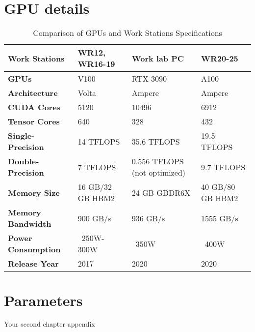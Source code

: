 \documentclass[report.tex]{subfiles}
\begin{document}
    \chapter{GPU details}
    \label{appendix:gpu_details}

    \begin{table}[h]
        \centering
        \caption{Comparison of GPUs and Work Stations Specifications}
        \begin{tabular}{|l|l|l|l|}
        \hline
        \textbf{Work Stations} & \textbf{WR12, WR16-19} & \textbf{Work lab PC} & \textbf{WR20-25} \\ \hline
        \textbf{GPUs} & V100 & RTX 3090 & A100 \\ \hline
        \textbf{Architecture} & Volta & Ampere & Ampere \\ \hline
        \textbf{CUDA Cores} & 5120 & 10496 & 6912 \\ \hline
        \textbf{Tensor Cores} & 640 & 328 & 432 \\ \hline
        \textbf{Single-Precision} & 14 TFLOPS & 35.6 TFLOPS & 19.5 TFLOPS \\ \hline
        \textbf{Double-Precision} & 7 TFLOPS & 0.556 TFLOPS (not optimized) & 9.7 TFLOPS \\ \hline
        \textbf{Memory Size} & 16 GB/32 GB HBM2 & 24 GB GDDR6X & 40 GB/80 GB HBM2 \\ \hline
        \textbf{Memory Bandwidth} & 900 GB/s & 936 GB/s & 1555 GB/s \\ \hline
        \textbf{Power Consumption} & ~250W-300W & ~350W & ~400W \\ \hline
        \textbf{Release Year} & 2017 & 2020 & 2020 \\ \hline
        \end{tabular}
        
        \label{tab:gpu_comparison}
    \end{table}
    
    


    \chapter{Parameters}
    Your second chapter appendix
\end{document}
